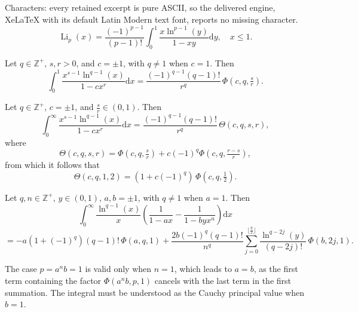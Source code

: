 \documentclass[10pt,a4paper]{amsart}
\begin{document}
Characters: every retained excerpt is pure ASCII, so the delivered engine, XeLaTeX with its default Latin Modern text font, reports no missing character.
\begin{equation}
	\operatorname{Li}_p(x)=\frac{{(-1)}^{p-1}}{(p-1)!}\int_0^1\frac{x\ln^{p-1}(y)}{1-xy}\mathrm{d} y,\quad x\leqslant1.\label{polylog}
\end{equation}

\begin{lemma}\label{lerch integral}
	Let $q\in\mathbb{Z}^{+}$, $s,r>0$, and $c=\pm1$, with $q\neq1$ when $c=1$. Then
	\[\int_0^1\frac{x^{s-1}\ln^{q-1}(x)}{1-cx^r}\mathrm{d} x=\frac{{(-1)}^{q-1}(q-1)!}{r^{q}}\,\Phi\left(c,q,\tfrac{s}{r}\right).\]
\end{lemma}

\begin{lemma} \label{theta integral}
	Let $q\in\mathbb{Z}^+$, $c=\pm1$, and $\frac{s}{r}\in(0,1)$. Then
	\[\int_0^\infty\frac{x^{s-1}\ln^{q-1}(x)}{1-cx^r}\mathrm{d} x=\frac{{(-1)}^{q-1}(q-1)!}{r^{q}}\,\Theta(c,q,s,r),\]
	where
	\begin{equation}
		\Theta(c,q,s,r)=\Phi\left(c,q,\tfrac{s}{r}\right)+c{(-1)}^{q}\Phi\left(c,q,\tfrac{r-s}{r}\right),\label{theta}
	\end{equation}
	from which it follows that
	\[\Theta(c,q,1,2)=(1+c{(-1)}^{q})\,\Phi(c,q,\tfrac12).\]
\end{lemma}

\begin{lemma} \label{tough integral}
	Let $q,n\in\mathbb{Z}^{+}$, $y\in(0,1)$, $a,b=\pm1$, with $q\neq1$ when $a=1$. Then
	\[\int_0^\infty \frac{\ln^{q-1}(x)}{x}\left(\frac{1}{1-ax}-\frac{1}{1-byx^{n}}\right)\mathrm{d} x\]
	\[=-a(1+{(-1)}^{q})(q-1)!\,\Phi(a,q,1)
	+\frac{2b{(-1)}^{q} (q-1)!}{n^{q}}\sum_{j=0}^{\lfloor\frac{q}{2}\rfloor}\frac{\ln^{q-2j}(y)}{(q-2j)!}\,\Phi(b,2j,1).\]
\end{lemma}

\begin{remark}
	The case $p=a^nb=1$ is valid only when $n=1$, which leads to $a=b$, as the first term containing the factor $\Phi(a^nb,p,1)$ cancels with the last term in the first summation. The integral must be understood as the Cauchy principal value when $b=1$.
\end{remark}
\end{document}
